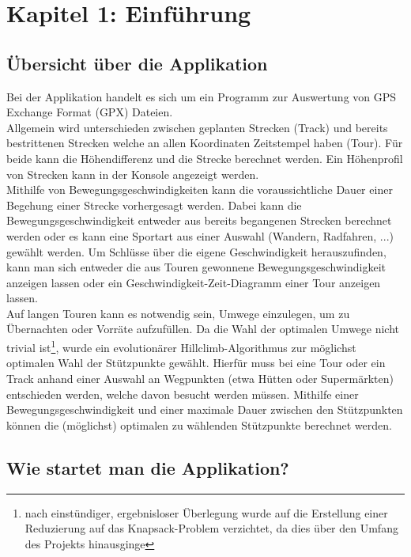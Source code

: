 \section{Kapitel 1: Einführung}


\subsection{Übersicht über die Applikation}

Bei der Applikation handelt es sich um ein Programm zur Auswertung von GPS Exchange Format (GPX) Dateien.\\

Allgemein wird unterschieden zwischen geplanten Strecken (Track) und bereits bestrittenen Strecken welche an allen Koordinaten Zeitstempel haben (Tour).
Für beide kann die Höhendifferenz und die Strecke berechnet werden.
Ein Höhenprofil von Strecken kann in der Konsole angezeigt werden.\\

Mithilfe von Bewegungsgeschwindigkeiten kann die voraussichtliche Dauer einer Begehung einer Strecke vorhergesagt werden. Dabei kann die Bewegungsgeschwindigkeit entweder aus bereits begangenen Strecken berechnet werden oder es kann eine Sportart aus einer Auswahl (Wandern, Radfahren, ...) gewählt werden.
Um Schlüsse über die eigene Geschwindigkeit herauszufinden, kann man sich entweder die aus Touren gewonnene Bewegungsgeschwindigkeit anzeigen lassen oder ein Geschwindigkeit-Zeit-Diagramm einer Tour anzeigen lassen.\\

Auf langen Touren kann es notwendig sein, Umwege einzulegen, um zu Übernachten oder Vorräte aufzufüllen.
Da die Wahl der optimalen Umwege nicht trivial ist\footnote{nach einstündiger, ergebnisloser Überlegung wurde auf die Erstellung einer Reduzierung auf das Knapsack-Problem verzichtet, da dies über den Umfang des Projekts hinausginge}, wurde ein evolutionärer Hillclimb-Algorithmus zur möglichst optimalen Wahl der Stützpunkte gewählt.
Hierfür muss bei eine Tour oder ein Track anhand einer Auswahl an Wegpunkten (etwa Hütten oder Supermärkten) entschieden werden, welche davon besucht werden müssen.
Mithilfe einer Bewegungsgeschwindigkeit und einer maximale Dauer zwischen den Stützpunkten können die (möglichst) optimalen zu wählenden Stützpunkte berechnet werden.


\subsection{Wie startet man die Applikation?}

